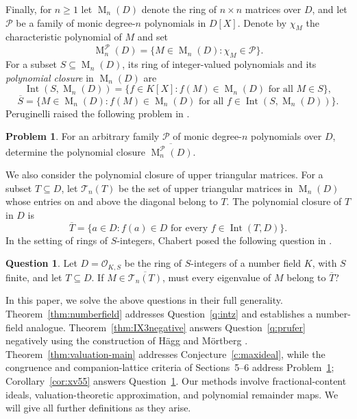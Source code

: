 \documentclass[11pt]{amsart}
\theoremstyle{definition}
\newtheorem{question}[theorem]{Question}
\newtheorem{problem}[theorem]{Problem}
\theoremstyle{remark}
\newcommand{\Int}{\operatorname{Int}}
\newcommand{\Mat}{\operatorname{M}}
\begin{document}
Finally, for $n\geq1$ let $\Mat_n(D)$ denote the ring of
$n\times n$ matrices over $D$, and let $\mathcal P$ be a family of
monic degree-$n$ polynomials in $D[X]$. Denote by $\chi_M$ the
characteristic polynomial of $M$ and set
\[
 \Mat_n^{\mathcal P}(D)
 =\{M\in\Mat_n(D):\chi_M\in\mathcal P\}.
\]
For a subset $S\subseteq\Mat_n(D)$, its ring of integer-valued
polynomials and its \emph{polynomial closure} in $\Mat_n(D)$ are
\[
 \Int(S,\Mat_n(D))
 =\{f\in K[X]:f(M)\in\Mat_n(D)\text{ for all }M\in S\},
\]
\[
 \overline S=\{M\in\Mat_n(D):
 f(M)\in\Mat_n(D)\text{ for all }f\in\Int(S,\Mat_n(D))\}.
\]
Peruginelli raised the following problem in
\cite[\S6]{Peruginelli2014}.
\begin{problem}\label{p:matrices}
For an arbitrary family $\mathcal P$ of monic degree-$n$
polynomials over $D$, determine the polynomial closure
$\overline{\Mat_n^{\mathcal P}(D)}$.
\end{problem}

We also consider the polynomial closure of upper triangular matrices.
For a subset $T\subseteq D$, let $\mathcal T_n(T)$ be the set of upper
triangular matrices in $\Mat_n(D)$ whose entries on and above the
diagonal belong to $T$. The polynomial closure of $T$ in $D$ is
\[
 \overline T=\{a\in D:f(a)\in D\text{ for every }f\in\Int(T,D)\}.
\]
In the setting of rings of $S$-integers, Chabert posed the following
question in
\cite[Open Question~XV.55, p.~530]{Chabert2025}.
\begin{question}\label{q:xv55}
Let $D=\mathcal O_{K,S}$ be the ring of $S$-integers of a number
field $K$, with $S$ finite, and let $T\subseteq D$.
If $M\in\overline{\mathcal T_n(T)}$, must every eigenvalue of $M$
belong to $\overline T$?
\end{question}

In this paper, we solve the above questions in their full generality.
Theorem~\ref{thm:numberfield} addresses Question~\ref{q:intz}
and establishes a number-field analogue. Theorem~\ref{thm:IX3negative}
answers Question~\ref{q:prufer} negatively using the construction
of H\"agg and M\"ortberg \cite{HaggMortberg2026}.
Theorem~\ref{thm:valuation-main} addresses
Conjecture~\ref{c:maxideal}, while the congruence and
companion-lattice criteria of Sections~5--6 address
Problem~\ref{p:matrices}; Corollary~\ref{cor:xv55} answers
Question~\ref{q:xv55}. Our methods involve fractional-content
ideals, valuation-theoretic approximation, and polynomial remainder
maps. We will give all further definitions as they arise.
\end{document}
